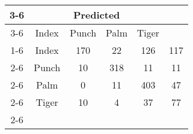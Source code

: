 \documentclass{standalone}
\begin{document}
 
 \begin{tabular}{|c |c |c |c |c |c |}
\cline{3-6}\multicolumn{2}{c|}{} & \multicolumn{4}{c|}{Predicted} \\ 
\cline{3-6} \multicolumn{2}{c |}{ } & Index & Punch & Palm & Tiger\\ 
\cline{1-6}\multirow{4}{*}{\rotatebox[origin=c]{90}{Actual}} & Index & 170 & 22 & 126 & 117\\ 
 \cline{2-6} & Punch & 10 & 318 & 11 & 11\\ 
 \cline{2-6} & Palm & 0 & 11 & 403 & 47\\ 
 \cline{2-6} & Tiger & 10 & 4 & 37 & 77\\ 
 \cline{2-6}\hline \end{tabular}
 
\end{document}
